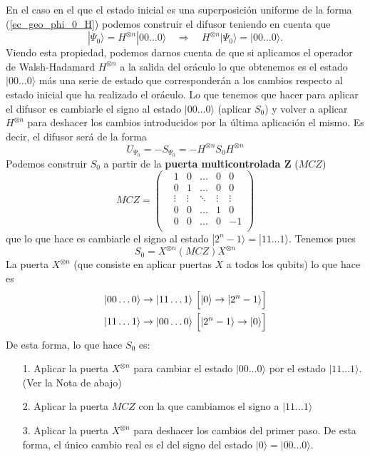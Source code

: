 \documentclass[a4paper,11pt]{book} %
\numberwithin{equation}{chapter}
\def\lp{\left(}
\def\rp{\right)}
\def\Lc{\Bigl[}
\def\Rc{\Bigr]}
\def\rqa{\quad \Rightarrow \quad}
\begin{document}
En el caso en el que el estado inicial es una superposición uniforme de la forma (\ref{ec_geo_phi_0_H}) podemos construir el difusor teniendo en cuenta que
\begin{equation}
|\Psi_0 \rangle = H^{\otimes n} |00 \dots 0 \rangle \rqa H^{\otimes n} |\Psi_0 \rangle = |0 0 \dots 0\rangle.
\end{equation}
Viendo esta propiedad, podemos darnos cuenta de que si aplicamos el operador de Walsh-Hadamard $H^{\otimes n}$ a la salida del oráculo lo que obtenemos es el estado $| 0 0 \dots 0 \rangle$ más una serie de estado que corresponderán a los cambios respecto al estado inicial que ha realizado el oráculo. Lo que tenemos que hacer para aplicar el difusor es cambiarle el signo al estado $| 0 0 \dots 0 \rangle$ (aplicar $S_0$) y volver a aplicar $H^{\otimes n}$ para deshacer los cambios introducidos por la última aplicación el mismo. Es decir, el difusor será de la forma
\begin{equation}
U_{\Psi_0} = - S_{\Psi_0}= - H^{\otimes n} S_0 H^{\otimes n}
\end{equation}
Podemos construir $S_0$ a partir de la \textbf{puerta multicontrolada Z} ($MCZ$)
\begin{equation}
MCZ = 
	\lp
		\begin{matrix}
			& 1 & 0  & \dots & 0 & 0 \\
			& 0 & 1  & \dots & 0 & 0 \\
			& \vdots  & \vdots & \ddots & \vdots & \vdots \\
			& 0 & 0 & \dots & 1 & 0 \\
			& 0 & 0 & \dots & 0 & -1 \\
		\end{matrix}
	\rp
\end{equation}
que lo que hace es cambiarle el signo al estado $|2^n-1\rangle= | 11 \dots 1\rangle$. Tenemos pues
\begin{equation}
S_0 = X^{\otimes n} (MCZ) X^{\otimes n}
\end{equation}
La puerta $X^{\otimes n}$ (que consiste en aplicar puertas $X$ a todos los qubits) lo que hace es 
\begin{align*}
& |00 \dots 0 \rangle \rightarrow |11 \dots 1 \rangle \, \, \Lc |0 \rangle \rightarrow | 2^n-1 \rangle \Rc \\
& |11 \dots 1 \rangle \rightarrow |00 \dots 0 \rangle \, \, \Lc |2^n-1 \rangle \rightarrow | 0 \rangle \Rc
\end{align*}
De esta forma, lo que hace $S_{0}$ es: 
\begin{itemize}
	\item[1.] Aplicar la puerta $X^{\otimes n}$ para cambiar el estado $|00 \dots 0 \rangle$ por el estado $|11 \dots 1 \rangle$. (Ver la Nota de abajo)
	
	\item[2.] Aplicar la puerta $MCZ$ con la que cambiamos el signo a $|11 \dots 1 \rangle$ 
	
	\item[3.] Aplicar la puerta $X^{\otimes n}$ para deshacer los cambios del primer paso. De esta forma, el único cambio real es el del signo del estado $|0\rangle = |00 \dots 0 \rangle$.
\end{itemize}
\end{document}

